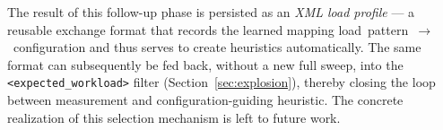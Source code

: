 The result of this follow-up phase is persisted as an \emph{XML load profile} --- a reusable
exchange format that records the learned mapping load~pattern~$\rightarrow$~configuration and thus
serves to create heuristics automatically. The same format can subsequently be fed back, without a
new full sweep, into the \texttt{<expected\_workload>} filter (Section~\ref{sec:explosion}), thereby
closing the loop between measurement and configuration-guiding heuristic. The concrete realization
of this selection mechanism is left to future work.
